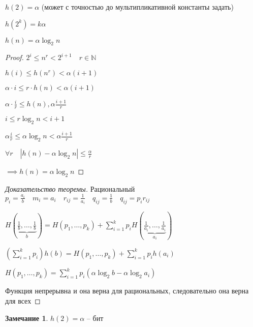 \documentclass{book}
\newcommand\N{\ensuremath{\mathbb{N}}}
\theoremstyle{definition}
\newtheorem*{note}{Замечание}
\begin{document}
     \begin{definition}
         $h(2) = \alpha$ (может с точностью до мультипликативной константы задать)
     \end{definition}

     \begin{lemma}
         $h(2^k) = k\alpha$
     \end{lemma}

     \begin{lemma}
         $h(n) = \alpha \log_2 n$
     \end{lemma}
     \begin{proof}
         $2^{i}\leqslant n^ r < 2^{i+1}\quad r\in \N $

         $h(i)\leqslant h\left( n^r \right)  < \alpha(i+1)$

         $\alpha\cdot i \leqslant  r\cdot h(n) < \alpha(i+1)$

         $\alpha\cdot \frac{i}{r}\leqslant h(n) , \alpha \frac{i+1}{r}$ 

         $i\leqslant r\log_2 n < i+1$

         $\alpha \frac{i}{r} \leqslant \alpha \log_2 n < \alpha \frac{i+1}{r}$ 

         $\forall r\quad \left| h(n) - \alpha \log_2 n \right| \leqslant  \frac{\alpha}{r}$ 

         $\implies  h(n) = \alpha \log_2 n$
     \end{proof}

     \begin{proof}
         [Доказательство теоремы]
         Рациональный $p_i = \frac{a_i}{b}\quad m_i = a_i\quad r_{ij} = \frac{1}{a_i}\quad q_{ij} = \frac{1}{b}\quad q_{ij} = p_ir_{ij}$ 


 $H\left( \underbrace{\frac{1}{b}, \ldots, \frac{1}{b}}\limits_{b} \right) = H\left( p_1, \ldots, p_k \right) +\sum_{i=1}^{k} p_iH\left( \underbrace{ \frac{1}{a_i}, \ldots, \frac{1}{a_i}}\limits_{a_i} \right)  $ 

 $\left(\sum_{i=1}^{k}  p_i \right) h(b) = H\left( p_1, \ldots, p_k \right)  + \sum_{i=1}^{k} p_ih(a_i)$    

 $H\left( p_1, \ldots, p_k \right)  = \sum_{i=1}^{k} p_i\left( \alpha \log_2 b - \alpha \log_2 a_i \right) $

 Функция непрерывна и она верна для рациональных, следовательно она верна для всех
     \end{proof}
     \begin{note}
         $h(2) = \alpha$ -- бит
     \end{note}
\end{document}
